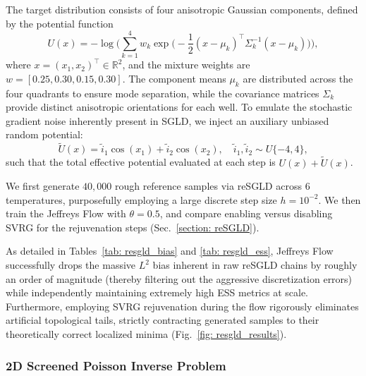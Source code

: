 \documentclass[%
 reprint,
 amsmath,amssymb,
 aps,
 pre,
]{revtex4-2}
\begin{document}
The target distribution consists of four anisotropic Gaussian components, defined by the potential function
\begin{equation*}
	U(x) = -\log \bigg( \sum_{k=1}^4 w_k \exp \Big( -\frac{1}{2}(x - \mu_k)^\top \Sigma_k^{-1} (x - \mu_k) \Big) \bigg),
\end{equation*}
where $x = (x_1, x_2)^\top \in \mathbb{R}^2$, and the mixture weights are $w = [0.25, 0.30, 0.15, 0.30]$. The component means $\mu_k$ are distributed across the four quadrants to ensure mode separation, while the covariance matrices $\Sigma_k$ provide distinct anisotropic orientations for each well. To emulate the stochastic gradient noise inherently present in SGLD, we inject an auxiliary unbiased random potential:
\begin{equation*}
	\tilde{U}(x) = \tilde{i}_1 \cos(x_1) + \tilde{i}_2 \cos(x_2), \quad \tilde{i}_1, \tilde{i}_2 \sim U\{-4, 4\},
\end{equation*}
such that the total effective potential evaluated at each step is $U(x) + \tilde{U}(x)$.

We first generate $40,000$ rough reference samples via reSGLD across $6$ temperatures, purposefully employing a large discrete step size $h = 10^{-2}$. We then train the Jeffreys Flow with $\theta = 0.5$, and compare enabling versus disabling SVRG for the rejuvenation steps (Sec.~\ref{section: reSGLD}).

As detailed in Tables~\ref{tab: resgld_bias} and \ref{tab: resgld_ess}, Jeffreys Flow successfully drops the massive $L^2$ bias inherent in raw reSGLD chains by roughly an order of magnitude (thereby filtering out the aggressive discretization errors) while independently maintaining extremely high ESS metrics at scale. Furthermore, employing SVRG rejuvenation during the flow rigorously eliminates artificial topological tails, strictly contracting generated samples to their theoretically correct localized minima (Fig.~\ref{fig: resgld_results}).

\subsubsection*{2D Screened Poisson Inverse Problem}
\end{document}
